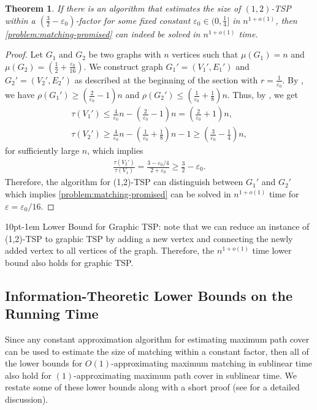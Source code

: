 \documentclass[letterpaper,11pt]{article}
\makeatletter
\renewcommand{\epsilon}{\varepsilon}
\newcommand{\tspsize}[1]{\ensuremath{\tau}(#1)}
\newtheorem{theorem}{Theorem}[section]
\newenvironment{myproof}{
\vspace{-0.5cm}
\begin{proof}
}{
\end{proof}
}
\renewcommand{\paragraph}{%
  \@startsection{paragraph}{4}%
  {\z@}{10pt}{-1em}%
  {\normalfont\normalsize\bfseries}%
}
\makeatother
\begin{document}
\begin{theorem}\label{cor:matching-via-12tsp}
    If there is an algorithm that estimates the size of $(1,2)$-TSP within a $(\frac{3}{2} - \epsilon_0)$-factor for some fixed constant $\epsilon_0 \in (0, \frac{1}{4}]$ in $n^{1+o(1)}$, then \cref{problem:matching-promised} can indeed be solved in $n^{1+o(1)}$ time.
\end{theorem}
\begin{myproof}
Let $G_1$ and $G_2$ be two graphs with $n$ vertices such that $\mu(G_1) = n$ and $\mu(G_2) = (\frac{1}{2} + \frac{\epsilon_0}{16})$. We construct graph $G_1' = (V_1', E_1')$ and $G_2' = (V_2', E_2')$ as described at the beginning of the section with $r = \frac{1}{\epsilon_0}$. By , we have $\rho(G_1') \geq (\frac{2}{\epsilon_0} - 1)n$ and $\rho(G_2') \leq (\frac{1}{\epsilon_0}  + \frac{1}{8})n$. Thus, by , we get
\begin{align*}
    \tspsize{V_1'} \leq \frac{4}{\epsilon_0}n - (\frac{2}{\epsilon_0} - 1)n = (\frac{2}{\epsilon_0} + 1)n,\\
    \tspsize{V_2'} \geq \frac{4}{\epsilon_0}n - (\frac{1}{\epsilon_0} + \frac{1}{8})n - 1 \geq (\frac{3}{\epsilon_0} - \frac{1}{4})n,
\end{align*}
for sufficiently large $n$, which implies
\begin{align*}
    \frac{\tspsize{V_2'}}{\tspsize{V_1}} = \frac{3 - \epsilon_0/4}{2 + \epsilon_0} \geq \frac{3}{2} - \epsilon_0.
\end{align*}
Therefore, the algorithm for (1,2)-TSP can distinguish between $G_1'$ and $G_2'$ which implies \cref{problem:matching-promised} can be solved in $n^{1+o(1)}$ time for $\epsilon = \epsilon_0/16$.
\end{myproof}


\paragraph{Lower Bound for Graphic TSP:} note that we can reduce an instance of (1,2)-TSP to graphic TSP by adding a new vertex and connecting the newly added vertex to all vertices of the graph. Therefore, the $n^{1+o(1)}$ time lower bound also holds for graphic TSP.


\subsection{Information-Theoretic Lower Bounds on the Running Time}\label{sec:hardness}
Since any constant approximation algorithm for estimating maximum path cover can be used to estimate the size of matching within a constant factor, then all of the lower bounds for $O(1)$-approximating maximum matching in sublinear time also hold for $(1)$-approximating maximum path cover in sublinear time. We restate some of these lower bounds along with a short proof (see \cite{behnezhad2021} for a detailed discussion).
\end{document}
